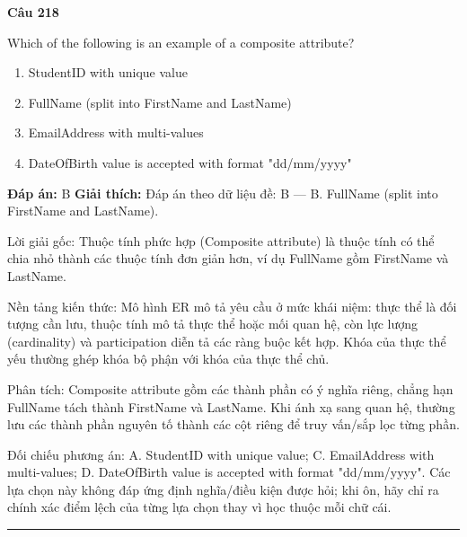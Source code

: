 \documentclass[11pt,a4paper]{article}
\newenvironment{question}[1]{%
  \par\vspace{1em}\noindent\textbf{\large Câu #1}\par\vspace{0.4em}
}{%
  \par\vspace{1em}\hrule\vspace{0.6em}
}
\newenvironment{choices}{%
  \begin{enumerate}[label=\textbf{\Alph*.},leftmargin=2.2em,itemsep=2pt,topsep=3pt]
}{%
  \end{enumerate}
}
\newcommand{\choice}{\item}
\begin{document}
\begin{question}{218}
Which of the following is an example of a composite attribute?
\begin{choices}
\choice StudentID with unique value
\choice FullName (split into FirstName and LastName)
\choice EmailAddress with multi-values
\choice DateOfBirth value is accepted with format "dd/mm/yyyy"
\end{choices}
\textbf{Đáp án:} B
\textbf{Giải thích:} Đáp án theo dữ liệu đề: B — B. FullName (split into FirstName and LastName).

Lời giải gốc: Thuộc tính phức hợp (Composite attribute) là thuộc tính có thể chia nhỏ thành các thuộc tính đơn giản hơn, ví dụ FullName gồm FirstName và LastName.

Nền tảng kiến thức: Mô hình ER mô tả yêu cầu ở mức khái niệm: thực thể là đối tượng cần lưu, thuộc tính mô tả thực thể hoặc mối quan hệ, còn lực lượng (cardinality) và participation diễn tả các ràng buộc kết hợp. Khóa của thực thể yếu thường ghép khóa bộ phận với khóa của thực thể chủ.

Phân tích: Composite attribute gồm các thành phần có ý nghĩa riêng, chẳng hạn FullName tách thành FirstName và LastName. Khi ánh xạ sang quan hệ, thường lưu các thành phần nguyên tố thành các cột riêng để truy vấn/sắp lọc từng phần.

Đối chiếu phương án: A. StudentID with unique value; C. EmailAddress with multi-values; D. DateOfBirth value is accepted with format "dd/mm/yyyy". Các lựa chọn này không đáp ứng định nghĩa/điều kiện được hỏi; khi ôn, hãy chỉ ra chính xác điểm lệch của từng lựa chọn thay vì học thuộc mỗi chữ cái.
\end{question}
\end{document}
